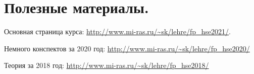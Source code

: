 \section{Полезные материалы.}

Основная страница курса: \url{http://www.mi-ras.ru/~sk/lehre/fp_hse2021/}.

Немного конспектов за 2020 год: \url{http://www.mi-ras.ru/~sk/lehre/fp_hse2020/}

Теория за 2018 год: \url{http://www.mi-ras.ru/~sk/lehre/fp_hse2018/}
